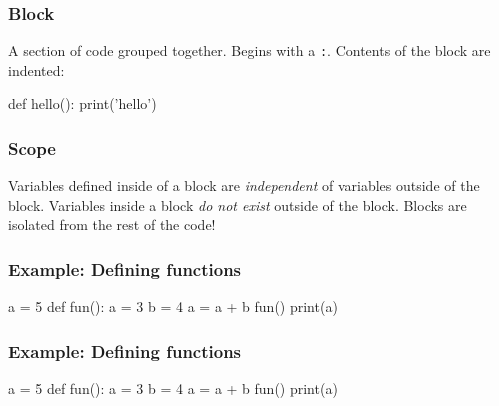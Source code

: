 \documentclass[11pt]{beamer}
\begin{document}
\begin{frame}[fragile]
  \frametitle{Block}
  \Enlarge

  \begin{itemize}
  \myitem  A section of code grouped together.
  \myitem  Begins with a \texttt{:}.
  \myitem  Contents of the block are indented:
  \end{itemize}
  \begin{semiverbatim}
def hello():
    print('hello')
  \end{semiverbatim}
\end{frame}

\begin{frame}
  \frametitle{Scope}
  \Enlarge

  \begin{itemize}
  \myitem  Variables defined inside of a block are \emph{independent} of variables outside of the block.
  \myitem  Variables inside a block \emph{do not exist} outside of the block.
  \myitem  Blocks are isolated from the rest of the code!
  \end{itemize}
\end{frame}

\begin{frame}[fragile]
  \frametitle{Example:  Defining functions}
  \Enlarge

  \begin{semiverbatim}
a = 5
def fun():
    a = 3
    b = 4
    a = a + b
fun()
print(a)
  \end{semiverbatim}
\end{frame}

\begin{frame}[fragile]
  \frametitle{Example:  Defining functions}
  \Enlarge

  \begin{semiverbatim}
a = 5
def fun():
    a = 3
    b = 4
    a = a + b
fun()
print(a)
  \end{semiverbatim}
\end{frame}
\end{document}
